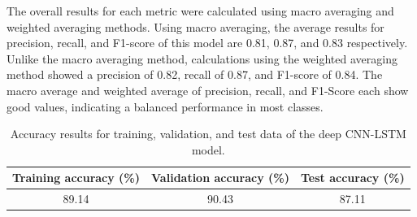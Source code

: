 The overall results for each metric were calculated using macro averaging and weighted averaging methods. Using macro averaging, the average results for precision, recall, and F1-score of this model are 0.81, 0.87, and 0.83 respectively. Unlike the macro averaging method, calculations using the weighted averaging method showed a precision of 0.82, recall of 0.87, and F1-score of 0.84. The macro average and weighted average of precision, recall, and F1-Score each show good values, indicating a balanced performance in most classes.

\begin{table}[h!]
	\caption{Accuracy results for training, validation, and test data of the deep CNN-LSTM model.}
	\label{tab:DeepCNNLSTMAccuracy}
	\centering
	\begin{tabular}{|c|c|c|}
		\hline
		Training accuracy (\%) & Validation accuracy (\%) & Test accuracy (\%) \\ \hline
		89.14                  & 90.43                    & 87.11              \\ \hline
	\end{tabular}
\end{table}

